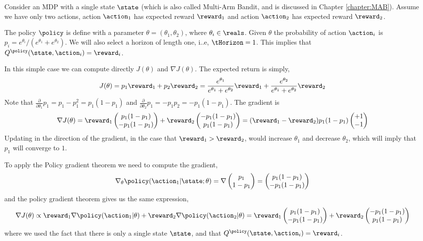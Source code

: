 \begin{example}
Consider an MDP with a single state $\state$ (which is also called
Multi-Arm Bandit, and is discussed in Chapter \ref{chapter:MAB}).
Assume we have only two actions, action $\action_1$ has expected
reward $\reward_1$ and action $\action_2$ has expected reward
$\reward_2$.

The policy $\policy$ is define with a parameter
$\theta=(\theta_1,\theta_2)$, where $\theta_i\in \reals$. Given
$\theta$ the probability of action $\action_i$ is
$p_i=e^{\theta_i}/(e^{\theta_1}+e^{\theta_2})$. We will also select
a horizon of length one, i..e, $\tHorizon=1$. This implies that
$Q^\policy(\state,\action_i)=\reward_i$.

In this simple case we can compute directly $J(\theta)$ and $\nabla
J(\theta)$. The expected return is simply,
\[
J(\theta)=p_1 \reward_1 + p_2 \reward_2 =
\frac{e^{\theta_1}}{e^{\theta_1}+e^{\theta_2}} \reward_1 +
\frac{e^{\theta_2}}{e^{\theta_1}+e^{\theta_2}} \reward_2
\]
Note that $\frac{\partial}{\partial \theta_1} p_1=
p_1-p_1^2=p_1(1-p_1) $ and $\frac{\partial }{\partial \theta_2} p_1=
- p_1 p_2= -p_1(1-p_1)$. The gradient is
\[
\nabla J(\theta)= \reward_1 \begin{pmatrix} p_1(1-p_1)\\
-p_1(1-p_1)\end{pmatrix} + \reward_2 \begin{pmatrix} -p_1(1-p_1)\\
p_1(1-p_1)\end{pmatrix} = (\reward_1-\reward_2) p_1(1-p_1) \begin{pmatrix}+1\\
-1\end{pmatrix}
\]
Updating in the direction of the gradient, in the case that
$\reward_1>\reward_2$, would increase $\theta_1$ and decrease
$\theta_2$, which will imply that $p_1$ will converge to $1$.

To apply the Policy gradient theorem we need to compute the
gradient,
\[
\nabla_\theta \policy(\action_1|\state;\theta) = \nabla \begin{pmatrix} p_1\\
1-p_1\end{pmatrix}=  \begin{pmatrix} p_1(1-p_1)\\
-p_1(1-p_1)\end{pmatrix}
\]
and the policy gradient theorem gives us the same expression,
\[
\nabla J(\theta) \propto \reward_1 \nabla
\policy(\action_1|\theta)+\reward_2 \nabla
\policy(\action_2|\theta)=\reward_1 \begin{pmatrix} p_1(1-p_1)\\
-p_1(1-p_1)\end{pmatrix} + \reward_2 \begin{pmatrix} -p_1(1-p_1)\\
p_1(1-p_1)\end{pmatrix}
\]
where we used the fact that there is only a single state $\state$,
and that $Q^\policy(\state,\action_i)=\reward_i$.
\end{example}

